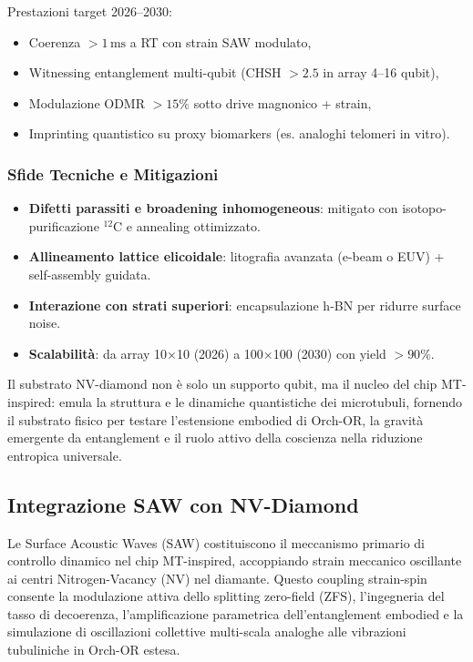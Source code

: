 \documentclass[12pt,a4paper]{article}
\begin{document}
Prestazioni target 2026--2030:
\begin{itemize}
    \item Coerenza $>1\,\mathrm{ms}$ a RT con strain SAW modulato,
    \item Witnessing entanglement multi-qubit (CHSH $>2.5$ in array 4--16 qubit),
    \item Modulazione ODMR $>15\%$ sotto drive magnonico + strain,
    \item Imprinting quantistico su proxy biomarkers (es. analoghi telomeri in vitro).
\end{itemize}

\subsubsection{Sfide Tecniche e Mitigazioni}

\begin{itemize}
    \item \textbf{Difetti parassiti e broadening inhomogeneous}: mitigato con isotopo-purificazione $^{12}$C e annealing ottimizzato.
    \item \textbf{Allineamento lattice elicoidale}: litografia avanzata (e-beam o EUV) + self-assembly guidata.
    \item \textbf{Interazione con strati superiori}: encapsulazione h-BN per ridurre surface noise.
    \item \textbf{Scalabilità}: da array 10×10 (2026) a 100×100 (2030) con yield $>90\%$.
\end{itemize}

Il substrato NV-diamond non è solo un supporto qubit, ma il nucleo del chip MT-inspired: emula la struttura e le dinamiche quantistiche dei microtubuli, fornendo il substrato fisico per testare l'estensione embodied di Orch-OR, la gravità emergente da entanglement e il ruolo attivo della coscienza nella riduzione entropica universale.





\subsection{Integrazione SAW con NV-Diamond}

Le Surface Acoustic Waves (SAW) costituiscono il meccanismo primario di controllo dinamico nel chip MT-inspired, accoppiando strain meccanico oscillante ai centri Nitrogen-Vacancy (NV) nel diamante. Questo coupling strain-spin consente la modulazione attiva dello splitting zero-field (ZFS), l'ingegneria del tasso di decoerenza, l'amplificazione parametrica dell'entanglement embodied e la simulazione di oscillazioni collettive multi-scala analoghe alle vibrazioni tubuliniche in Orch-OR estesa.
\end{document}
